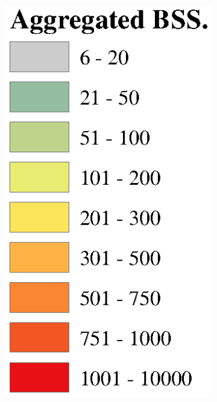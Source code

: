 \documentclass[preprints,article,accept,moreauthors,pdftex]{Definitions/mdpi}
\begin{document}
\begin{figure}[ht]
\begin{subfigure}{.14\textwidth}
        \includegraphics[width=\textwidth]{Figures/Overall_spatial_patterns/legend5.eps}
    \end{subfigure}
    

\end{figure}
\end{document}
